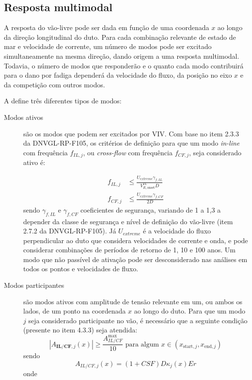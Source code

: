 \subsection{Resposta multimodal}\label{sec:multimode}


A resposta do vão-livre pode ser dada em função de uma coordenada $x$ ao longo da direção longitudinal do duto.
Para cada combinação relevante de estado de mar e velocidade de corrente, um número de modos pode ser excitado simultaneamente na mesma direção, dando origem a uma resposta multimodal.
Todavia, o número de modos que responderão e o quanto cada modo contribuirá para o dano por fadiga dependerá da velocidade do fluxo, da posição no eixo $x$ e da competição com outros modos.

A  define três diferentes tipos de modos:
\begin{description}
	\item[Modos ativos] são os modos que podem ser excitados por VIV\@. Com base no item 2.3.3 da DNVGL-RP-F105, os critérios de definição para que um modo \textit{in-line} com frequência $f_{IL,j}$, ou \textit{cross-flow} com frequência $f_{CF,j}$, seja considerado ativo é:

    \begin{equation}
        \begin{aligned}
        f_{I L, j} & \leq \frac{U_{extreme} \gamma_{f,IL}}{V_{R,\text{onset}}^{IL} D} \\
        f_{C F, j} & \leq \frac{U_{extreme} \gamma_{f,CF}}{2D}
        \end{aligned}
    \end{equation}
    sendo $\gamma_{f,IL}$ e $\gamma_{f,CF}$ coeficientes de segurança, variando de 1 a 1,3 a depender da classe de segurança e nível de
    definição do vão-livre (item 2.7.2 da DNVGL-RP-F105). Já $U_{extreme}$ é a velocidade do fluxo perpendicular ao duto que considera velocidades de corrente e onda, e pode considerar combinações de períodos de retorno de 1, 10 e 100 anos.
    Um modo que não passível de ativação pode ser desconsiderado nas análises em todos os pontos e velocidades de fluxo.

    \item[Modos participantes] são modos ativos com amplitude de tensão relevante em um, ou ambos os lados, de um ponto na coordenada $x$ ao longo do duto. Para que um modo $j$ seja considerado participante no vão, é necessário que a seguinte condição (presente no item 4.3.3) seja atendida:
    \[
    \left|A_{\textbf{IL/CF}, j}(x)\right| \geq \frac{A_{IL/CF}^{\max}}{10} \text{ para algum } x \in (x_{\text{start},j}, x_{\text{end}, j})
    \]
    sendo
    \[
    A_{IL/CF, j}(x) = (1+CSF) D \kappa_{j}(x) E r
    \]
    onde


\end{description}
